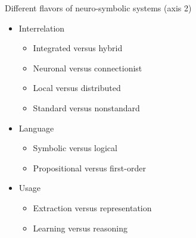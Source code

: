 \documentclass{lecture}
\begin{document}
\begin{frame}{Different flavors of neuro-symbolic systems (axis 2)}
    \begin{itemize}
        \item Interrelation
            \begin{itemize}
                \item Integrated versus hybrid
                \item Neuronal versus connectionist
                \item Local versus distributed
                \item Standard versus nonstandard
            \end{itemize}
            \item Language
                \begin{itemize}
                \item Symbolic versus logical
                \item Propositional versus first-order
                \end{itemize}
            \item Usage
                \begin{itemize}                
                \item Extraction versus representation
                \item Learning versus reasoning
                \end{itemize}
        \end{itemize}
\end{frame}
\end{document}
